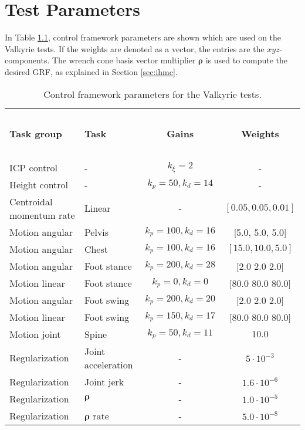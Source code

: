 %
\chapter{Test Parameters}\label{chap:params}
In Table \ref{tab:params}, control framework parameters are shown which are used on the Valkyrie tests.  If the weights are denoted as a vector, the entries are the $xyz$-components. The wrench cone basis vector multiplier $\boldsymbol{\rho}$ is used to  compute the desired \ac{GRF}, as explained in Section \ref{sec:ihmc}.

\begin{table}[h]
\caption{Control framework parameters for the Valkyrie tests.}
\label{tab:params}
\begin{center}
\begin{tabular}{llcc}
\hline~\\[-2ex]
\textbf{Task group} & \textbf{Task} & \textbf{Gains} & \textbf{Weights}\\
\hline ~\\[-2ex]
ICP control & - & $k_{\xi}=2$ & - \\
Height control & - & $k_p=50, k_d=14$ & - \\
Centroidal momentum rate & Linear & - & $[0.05, 0.05, 0.01]$ \\
Motion angular & Pelvis & $k_p=100, k_d=16$ & [5.0, 5.0, 5.0]\\
Motion angular & Chest & $k_p=100, k_d=16$ & $[15.0, 10.0, 5.0]$\\
Motion angular & Foot stance & $k_p=200, k_d=28$ &  [2.0 2.0 2.0]\\
Motion linear & Foot stance & $k_p=0, k_d=0$ & [80.0 80.0 80.0]\\
Motion angular & Foot swing & $k_p=200, k_d=20$ & [2.0 2.0 2.0]\\
Motion linear & Foot swing & $k_p=150, k_d=17$ & [80.0 80.0 80.0]\\
Motion joint& Spine & $k_p=50, k_d=11$ & $10.0$\\
Regularization & Joint acceleration & - & $5 \cdot 10^{-3}$\\
Regularization & Joint jerk & - & $1.6 \cdot 10^{-6}$\\
Regularization & $\boldsymbol{\rho}$ & - & $1.0 \cdot 10^{-5}$\\
Regularization & $\boldsymbol{\rho}$ rate & - & $5.0 \cdot 10^{-8}$\\
\hline
\end{tabular}
\end{center}
\end{table}